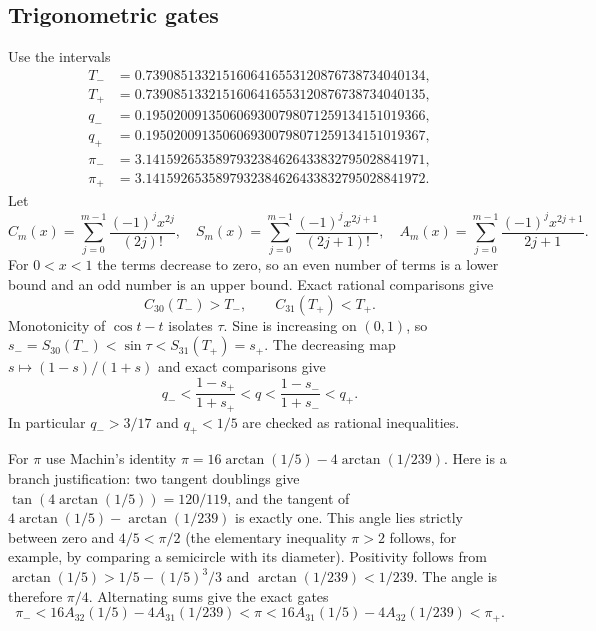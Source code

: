 \documentclass[11pt,a4paper]{article}
\theoremstyle{remark}\newtheorem{remark}[theorem]{Remark}
\begin{document}
\subsection{Trigonometric gates}
Use the intervals
\begin{align*}
T_-&=0.7390851332151606416553120876738734040134,\\
T_+&=0.7390851332151606416553120876738734040135,\\
q_-&=0.1950200913506069300798071259134151019366,\\
q_+&=0.1950200913506069300798071259134151019367,\\
\pi_-&=3.1415926535897932384626433832795028841971,\\
\pi_+&=3.1415926535897932384626433832795028841972.
\end{align*}
Let
\[
C_m(x)=\sum_{j=0}^{m-1}\frac{(-1)^jx^{2j}}{(2j)!},\quad
S_m(x)=\sum_{j=0}^{m-1}\frac{(-1)^jx^{2j+1}}{(2j+1)!},\quad
A_m(x)=\sum_{j=0}^{m-1}\frac{(-1)^jx^{2j+1}}{2j+1}.
\]
For $0<x<1$ the terms decrease to zero, so an even number of terms
is a lower bound and an odd number is an upper bound. Exact rational
comparisons give
\[
C_{30}(T_-)>T_-,\qquad C_{31}(T_+)<T_+.
\]
Monotonicity of $\cos t-t$ isolates $\tau$. Sine is increasing on
$(0,1)$, so $s_-=S_{30}(T_-)<\sin\tau<S_{31}(T_+)=s_+$.
The decreasing map $s\mapsto(1-s)/(1+s)$ and exact comparisons give
\[
q_-<\frac{1-s_+}{1+s_+}<q<\frac{1-s_-}{1+s_-}<q_+.
\]
In particular $q_->3/17$ and $q_+<1/5$ are checked as rational
inequalities.

For $\pi$ use Machin's identity
$\pi=16\arctan(1/5)-4\arctan(1/239)$. Here is a branch justification:
two tangent doublings give $\tan(4\arctan(1/5))=120/119$,
and the tangent of $4\arctan(1/5)-\arctan(1/239)$ is exactly one.
This angle lies strictly between zero and $4/5<\pi/2$ (the elementary
inequality $\pi>2$ follows, for example, by comparing a semicircle
with its diameter). Positivity follows from
$\arctan(1/5)>1/5-(1/5)^3/3$ and $\arctan(1/239)<1/239$.
The angle is therefore $\pi/4$. Alternating sums give the exact gates
\[
\pi_-<16A_{32}(1/5)-4A_{31}(1/239)
<\pi<16A_{31}(1/5)-4A_{32}(1/239)<\pi_+.
\]
\end{document}
